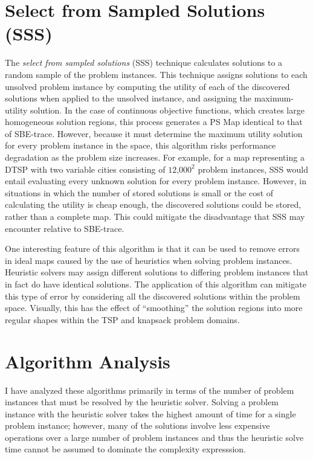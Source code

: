 \section{Select from Sampled Solutions (SSS)}
\label{sec:sss}
The \textit{select from sampled solutions} (SSS) technique calculates solutions to a random sample of the problem instances.  This technique assigns solutions to each unsolved problem instance by computing the utility of each of the discovered solutions when applied to the unsolved instance, and assigning the maximum-utility solution.  In the case of continuous objective functions, which creates large homogeneous solution regions, this process generates a PS Map identical to that of SBE-trace.  However, because it must determine the maximum utility solution for every problem instance in the space, this algorithm risks performance degradation as the problem size increases.  For example, for a map representing a DTSP with two variable cities consisting of $\textrm{12,000}^{\textrm{2}}$ problem instances, SSS would entail evaluating every unknown solution for every problem instance.  However, in situations in which the number of stored solutions is small or the cost of calculating the utility is cheap enough, the discovered solutions could be stored, rather than a complete map.  This could mitigate the disadvantage that SSS may encounter relative to SBE-trace.

One interesting feature of this algorithm is that it can be used to remove errors in ideal maps caused by the use of heuristics when solving problem instances.  Heuristic solvers may assign different solutions to differing problem instances that in fact do have identical solutions. The  application of this algorithm can mitigate this type of error by considering all the discovered solutions within the problem space.  Visually, this has the effect of ``smoothing'' the solution regions into more regular shapes within the TSP and knapsack problem domains.

\section{Algorithm Analysis}

I have analyzed these algorithms primarily in terms of the number of problem instances that must be resolved by the heuristic solver.  Solving a problem instance with the heuristic solver takes the highest amount of time for a single problem instance; however, many of the solutions involve less expensive operations over a large number of problem instances and thus the heuristic solve time cannot be assumed to dominate the complexity expresssion.  

